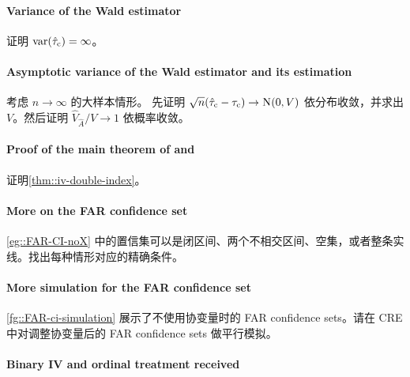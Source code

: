  
\paragraph{Variance of the Wald estimator}\label{problem::infinite-var-iv}

证明 $\textup{var}(\hat{\tau}_{\textup{c}}) = \infty$。



\paragraph{Asymptotic variance of the Wald estimator and its estimation}\label{problem::var-iv-estimate}


考虑 $n\rightarrow \infty$ 的大样本情形。
先证明 $\sqrt{n}(\hat{\tau}_{\textup{c}} - \tau_{\textup{c}}) \rightarrow \textsc{N}(0, V)$ 依分布收敛，并求出 $V$。然后证明 $\hat{V}_{\hat{A}} /V \rightarrow 1$ 依概率收敛。

 
 
 
\paragraph{Proof of the main theorem of  \citet{imbens1994identification} and \citet{angrist1996identification}} 
 \label{para::iv-alternative-form-theorem}
 
 证明\cref{thm::iv-double-index}。
 


\paragraph{More on the FAR confidence set}\label{para::FAR-CI-cases}

\cref{eg::FAR-CI-noX} 中的置信集可以是闭区间、两个不相交区间、空集，或者整条实线。找出每种情形对应的精确条件。
 
 
 \paragraph{More simulation for the FAR confidence set}\label{para::FAR-CI-simulation-X}

\cref{fg::FAR-ci-simulation} 展示了不使用协变量时的 FAR confidence sets。请在 CRE 中对调整协变量后的 FAR confidence sets 做平行模拟。
 
 
\paragraph{Binary IV and ordinal treatment received}\label{para::iv-ordinal-treatment}

